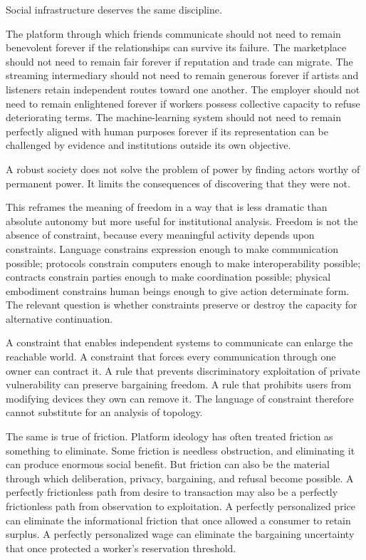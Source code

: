 \documentclass[11pt]{article}
\begin{document}
Social infrastructure deserves the same discipline.

The platform through which friends communicate should not need to remain benevolent forever if the relationships can survive its failure. The marketplace should not need to remain fair forever if reputation and trade can migrate. The streaming intermediary should not need to remain generous forever if artists and listeners retain independent routes toward one another. The employer should not need to remain enlightened forever if workers possess collective capacity to refuse deteriorating terms. The machine-learning system should not need to remain perfectly aligned with human purposes forever if its representation can be challenged by evidence and institutions outside its own objective.

A robust society does not solve the problem of power by finding actors worthy of permanent power. It limits the consequences of discovering that they were not.

This reframes the meaning of freedom in a way that is less dramatic than absolute autonomy but more useful for institutional analysis. Freedom is not the absence of constraint, because every meaningful activity depends upon constraints. Language constrains expression enough to make communication possible; protocols constrain computers enough to make interoperability possible; contracts constrain parties enough to make coordination possible; physical embodiment constrains human beings enough to give action determinate form. The relevant question is whether constraints preserve or destroy the capacity for alternative continuation.

A constraint that enables independent systems to communicate can enlarge the reachable world. A constraint that forces every communication through one owner can contract it. A rule that prevents discriminatory exploitation of private vulnerability can preserve bargaining freedom. A rule that prohibits users from modifying devices they own can remove it. The language of constraint therefore cannot substitute for an analysis of topology.

The same is true of friction. Platform ideology has often treated friction as something to eliminate. Some friction is needless obstruction, and eliminating it can produce enormous social benefit. But friction can also be the material through which deliberation, privacy, bargaining, and refusal become possible. A perfectly frictionless path from desire to transaction may also be a perfectly frictionless path from observation to exploitation. A perfectly personalized price can eliminate the informational friction that once allowed a consumer to retain surplus. A perfectly personalized wage can eliminate the bargaining uncertainty that once protected a worker's reservation threshold.
\end{document}
